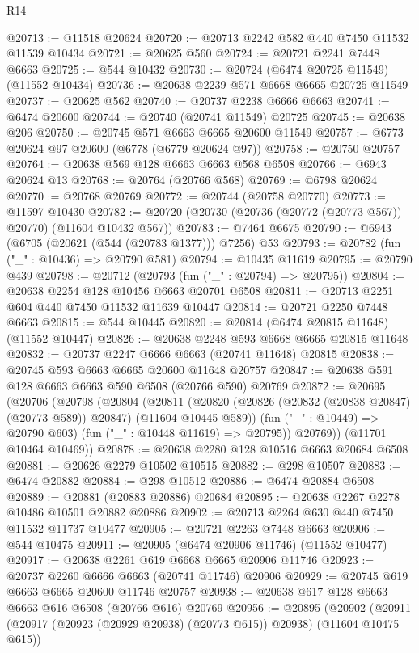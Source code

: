 \begin{lexlean}{R14}
\begin{coremodule}
{{{{{{{{{{{{{{{{{{{{{{{{{{{{{{{{{{{{{{{{{{{{{{{{{{{{{{{{{{{{{{{{{{{{{{{{{{{{{{{{{{@20713 := @11518 @20624
@20720 := @20713 @2242 @582 @440 @7450 @11532 @11539 @10434
@20721 := @20625 @560
@20724 := @20721 @2241 @7448 @6663
@20725 := @544 @10432
@20730 := @20724 (@6474 @20725 @11549) (@11552 @10434)
@20736 := @20638 @2239 @571 @6668 @6665 @20725 @11549
@20737 := @20625 @562
@20740 := @20737 @2238 @6666 @6663
@20741 := @6474 @20600
@20744 := @20740 (@20741 @11549) @20725
@20745 := @20638 @206
@20750 := @20745 @571 @6663 @6665 @20600 @11549
@20757 := @6773 @20624 @97 @20600 (@6778 (@6779 @20624 @97))
@20758 := @20750 @20757
@20764 := @20638 @569 @128 @6663 @6663 @568 @6508
@20766 := @6943 @20624 @13
@20768 := @20764 (@20766 @568)
@20769 := @6798 @20624
@20770 := @20768 @20769
@20772 := @20744 (@20758 @20770)
@20773 := @11597 @10430
@20782 := @20720 (@20730 (@20736 (@20772 (@20773 @567)) @20770) (@11604 @10432 @567))
@20783 := @7464 @6675
@20790 := @6943 (@6705 (@20621 (@544 (@20783 @1377))) @7256) @53
@20793 := @20782 (fun ("_" : @10436) => @20790 @581)
@20794 := @10435 @11619
@20795 := @20790 @439
@20798 := @20712 (@20793 (fun ("_" : @20794) => @20795))
@20804 := @20638 @2254 @128 @10456 @6663 @20701 @6508
@20811 := @20713 @2251 @604 @440 @7450 @11532 @11639 @10447
@20814 := @20721 @2250 @7448 @6663
@20815 := @544 @10445
@20820 := @20814 (@6474 @20815 @11648) (@11552 @10447)
@20826 := @20638 @2248 @593 @6668 @6665 @20815 @11648
@20832 := @20737 @2247 @6666 @6663 (@20741 @11648) @20815
@20838 := @20745 @593 @6663 @6665 @20600 @11648 @20757
@20847 := @20638 @591 @128 @6663 @6663 @590 @6508 (@20766 @590) @20769
@20872 := @20695
    (@20706
      (@20798
        (@20804
          (@20811
            (@20820 (@20826 (@20832 (@20838 @20847) (@20773 @589)) @20847) (@11604 @10445 @589))
            (fun ("_" : @10449) => @20790 @603)
            (fun ("_" : @10448 @11619) => @20795))
          @20769))
      (@11701 @10464 @10469))
@20878 := @20638 @2280 @128 @10516 @6663 @20684 @6508
@20881 := @20626 @2279 @10502 @10515
@20882 := @298 @10507
@20883 := @6474 @20882
@20884 := @298 @10512
@20886 := @6474 @20884 @6508
@20889 := @20881 (@20883 @20886) @20684
@20895 := @20638 @2267 @2278 @10486 @10501 @20882 @20886
@20902 := @20713 @2264 @630 @440 @7450 @11532 @11737 @10477
@20905 := @20721 @2263 @7448 @6663
@20906 := @544 @10475
@20911 := @20905 (@6474 @20906 @11746) (@11552 @10477)
@20917 := @20638 @2261 @619 @6668 @6665 @20906 @11746
@20923 := @20737 @2260 @6666 @6663 (@20741 @11746) @20906
@20929 := @20745 @619 @6663 @6665 @20600 @11746 @20757
@20938 := @20638 @617 @128 @6663 @6663 @616 @6508 (@20766 @616) @20769
@20956 := @20895
    (@20902
      (@20911 (@20917 (@20923 (@20929 @20938) (@20773 @615)) @20938) (@11604 @10475 @615))
}}}}}}}}}}}}}}}}}}}}}}}}}}}}}}}}}}}}}}}}}}}}}}}}}}}}}}}}}}}}}}}}}}}}}}}}}}}}}}}}}}
\end{coremodule}
\end{lexlean}
